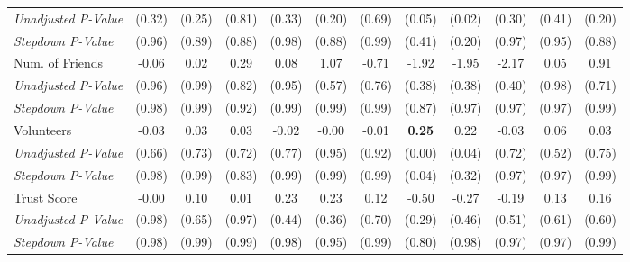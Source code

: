 \begin{tabular}{l c c c c c c c c c c c}
\quad \textit{Unadjusted P-Value} & (0.32) & (0.25) & (0.81) & (0.33) & (0.20) & (0.69) & (0.05) & (0.02) & (0.30) & (0.41) & (0.20) \\
\quad \textit{Stepdown P-Value} & (0.96) & (0.89) & (0.88) & (0.98) & (0.88) & (0.99) & (0.41) & (0.20) & (0.97) & (0.95) & (0.88) \\
Num. of Friends & -0.06 & 0.02 & 0.29 & 0.08 & 1.07 & -0.71 & -1.92 & -1.95 & -2.17 & 0.05 & 0.91 \\
\quad \textit{Unadjusted P-Value} & (0.96) & (0.99) & (0.82) & (0.95) & (0.57) & (0.76) & (0.38) & (0.38) & (0.40) & (0.98) & (0.71) \\
\quad \textit{Stepdown P-Value} & (0.98) & (0.99) & (0.92) & (0.99) & (0.99) & (0.99) & (0.87) & (0.97) & (0.97) & (0.97) & (0.99) \\
Volunteers & -0.03 & 0.03 & 0.03 & -0.02 & -0.00 & -0.01 & \textbf{ 0.25 } & 0.22 & -0.03 & 0.06 & 0.03 \\
\quad \textit{Unadjusted P-Value} & (0.66) & (0.73) & (0.72) & (0.77) & (0.95) & (0.92) & (0.00) & (0.04) & (0.72) & (0.52) & (0.75) \\
\quad \textit{Stepdown P-Value} & (0.98) & (0.99) & (0.83) & (0.99) & (0.99) & (0.99) & (0.04) & (0.32) & (0.97) & (0.97) & (0.99) \\
Trust Score & -0.00 & 0.10 & 0.01 & 0.23 & 0.23 & 0.12 & -0.50 & -0.27 & -0.19 & 0.13 & 0.16 \\
\quad \textit{Unadjusted P-Value} & (0.98) & (0.65) & (0.97) & (0.44) & (0.36) & (0.70) & (0.29) & (0.46) & (0.51) & (0.61) & (0.60) \\
\quad \textit{Stepdown P-Value} & (0.98) & (0.99) & (0.99) & (0.98) & (0.95) & (0.99) & (0.80) & (0.98) & (0.97) & (0.97) & (0.99) \\
\bottomrule
\end{tabular}
